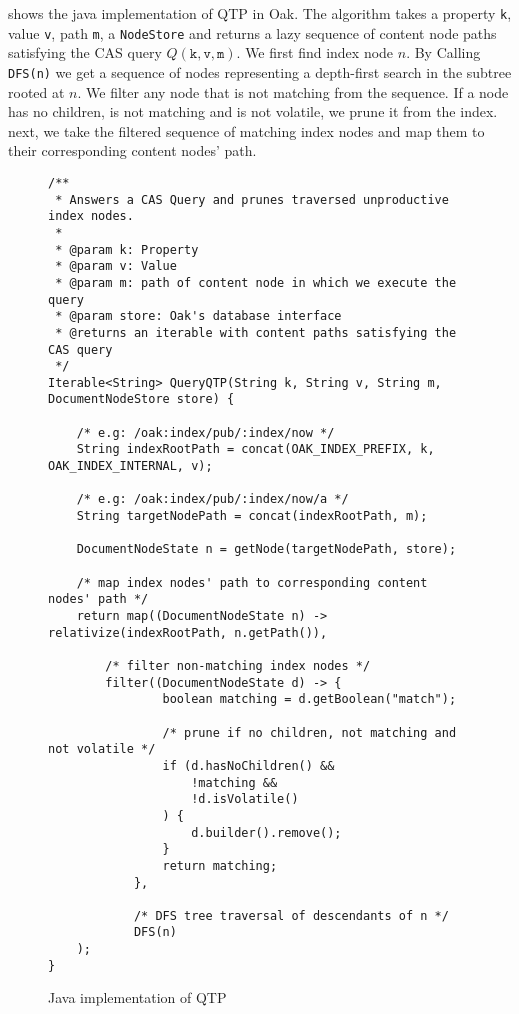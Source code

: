 \documentclass[abstracton,12pt]{scrartcl}
\theoremstyle{definition}
\begin{document}
 shows the java implementation of QTP in Oak. The algorithm
takes a property \texttt{k}, value \texttt{v}, path \texttt{m}, a
\texttt{NodeStore} and returns a lazy sequence of content node paths satisfying
the CAS query $Q(\texttt{k},\texttt{v},\texttt{m})$. We first find index node
$n$. By Calling \texttt{DFS(n)} we get a sequence of nodes representing a
depth-first search in the subtree rooted at $n$. We filter any node that is not
matching from the sequence. If a node has no children, is not matching and is
not volatile, we prune it from the index. next, we take the filtered sequence of
matching index nodes and map them to their corresponding content nodes' path.

\begin{figure}
  \centering
\begin{verbatim}
/**
 * Answers a CAS Query and prunes traversed unproductive index nodes.
 *
 * @param k: Property
 * @param v: Value
 * @param m: path of content node in which we execute the query
 * @param store: Oak's database interface
 * @returns an iterable with content paths satisfying the CAS query
 */
Iterable<String> QueryQTP(String k, String v, String m, DocumentNodeStore store) {

    /* e.g: /oak:index/pub/:index/now */
    String indexRootPath = concat(OAK_INDEX_PREFIX, k, OAK_INDEX_INTERNAL, v); 

    /* e.g: /oak:index/pub/:index/now/a */
    String targetNodePath = concat(indexRootPath, m);

    DocumentNodeState n = getNode(targetNodePath, store);

    /* map index nodes' path to corresponding content nodes' path */
    return map((DocumentNodeState n) -> relativize(indexRootPath, n.getPath()),

        /* filter non-matching index nodes */
        filter((DocumentNodeState d) -> {
                boolean matching = d.getBoolean("match");

                /* prune if no children, not matching and not volatile */
                if (d.hasNoChildren() &&
                    !matching &&
                    !d.isVolatile()
                ) {
                    d.builder().remove();
                }
                return matching;
            },

            /* DFS tree traversal of descendants of n */
            DFS(n)
    );
}
\end{verbatim}
  \caption{Java implementation of QTP}
  \label{fig:java_qtp}
\end{figure}
\end{document}
